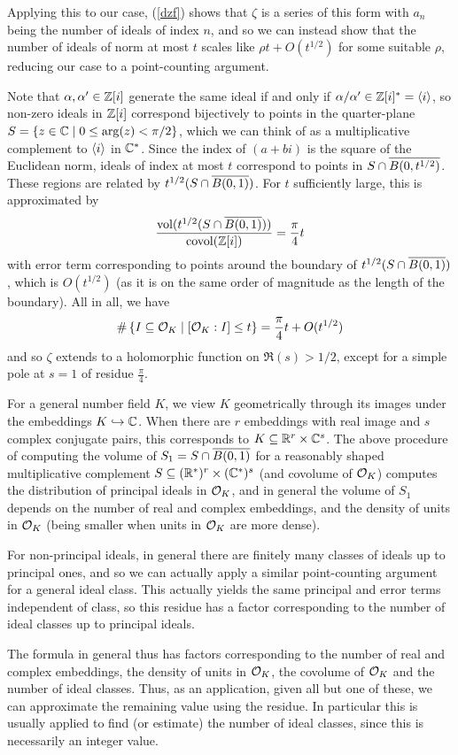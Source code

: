 \documentclass[11pt]{article}
\begin{document}
Applying this to our case, (\ref{dzf}) shows that $\zeta$ is a series of this form with $a_n$ being the number of ideals of index $n$, and so we can instead show that the number of ideals of norm at most $t$ scales like $\rho t + O(t^{1/2})$ for some suitable $\rho$, reducing our case to a point-counting argument.

Note that $\alpha, \alpha' \in \mathbb{Z}[i]$ generate the same ideal if and only if $\alpha/\alpha' \in \mathbb{Z}[i]^* = \left\langle i \right\rangle$, so non-zero ideals in $\mathbb{Z}[i]$ correspond bijectively to points in the quarter-plane $S = \left\{  z \in \mathbb{C} \mid 0 \leq \arg(z) < \pi/2  \right\}$, which we can think of as a multiplicative complement to $\left\langle i \right\rangle$ in $\mathbb{C}^*$. Since the index of $(a + bi)$ is the square of the Euclidean norm, ideals of index at most $t$ correspond to points in $S \cap \overline{B(0, t^{1/2})}$. These regions are related by $t^{1/2}(S \cap \overline{B(0, 1)})$. For $t$ sufficiently large, this is approximated by
$$
    \frac{\operatorname{vol}(t^{1/2}(S \cap \overline{B(0, 1)}))}{\operatorname{covol}(\mathbb{Z}[i])} = \frac\pi4t
$$
with error term corresponding to points around the boundary of $t^{1/2}(S \cap \overline{B(0, 1)})$, which is $O(t^{1/2})$ (as it is on the same order of magnitude as the length of the boundary). All in all, we have
$$
    \#\left\{  I \subseteq \mathcal{O}_K \mid [\mathcal{O}_K : I] \leq t  \right\} = \frac\pi4t + O(t^{1/2})
$$
and so $\zeta$ extends to a holomorphic function on $\Re(s) > 1/2$, except for a simple pole at $s = 1$ of residue $\frac\pi4$.

For a general number field $K$, we view $K$ geometrically through its images under the embeddings $K \hookrightarrow \mathbb{C}$. When there are $r$ embeddings with real image and $s$ complex conjugate pairs, this corresponds to $K \subseteq \mathbb{R}^r \times \mathbb{C}^s$. The above procedure of computing the volume of $S_1 = S \cap \overline{B(0, 1)}$ for a reasonably shaped multiplicative complement $S \subseteq (\mathbb{R}^*)^r \times (\mathbb{C}^*)^s$ (and covolume of $\mathcal{O}_K$) computes the distribution of principal ideals in $\mathcal{O}_K$, and in general the volume of $S_1$ depends on the number of real and complex embeddings, and the density of units in $\mathcal{O}_K$ (being smaller when units in $\mathcal{O}_K$ are more dense).

For non-principal ideals, in general there are finitely many classes of ideals up to principal ones, and so we can actually apply a similar point-counting argument for a general ideal class. This actually yields the same principal and error terms independent of class, so this residue has a factor corresponding to the number of ideal classes up to principal ideals.

The formula in general thus has factors corresponding to the number of real and complex embeddings, the density of units in $\mathcal{O}_K$, the covolume of $\mathcal{O}_K$ and the number of ideal classes. Thus, as an application, given all but one of these, we can approximate the remaining value using the residue. In particular this is usually applied to find (or estimate) the number of ideal classes, since this is necessarily an integer value.
\end{document}
